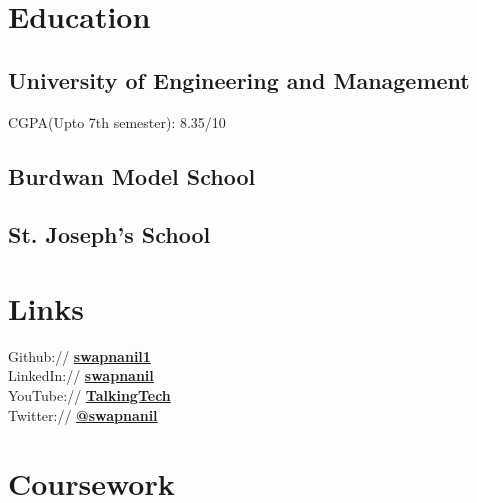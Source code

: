 \documentclass[]{swapnanil-resume}
\begin{document}
\begin{minipage}[t]{0.33\textwidth} 


\section{Education} 

\subsection{University of Engineering and Management}
CGPA(Upto 7th semester): 8.35/10

\sectionsep

\subsection{Burdwan Model
School}

\sectionsep

\subsection{St. Joseph's School}

\sectionsep


\section{Links} 
Github:// \href{https://github.com/swapnanil1}{\bf swapnanil1} \\
LinkedIn://  \href{https://www.linkedin.com/in/swapnanil-chakraborty-046887294/}{\bf swapnanil} \\
YouTube://  \href{https://www.youtube.com/@TalkingTechTeam}{\bf TalkingTech} \\
Twitter://  \href{https://twitter.com/swapnanil111}{\bf @swapnanil} \\

\sectionsep

\section{Coursework}

\end{minipage}
\end{document}
